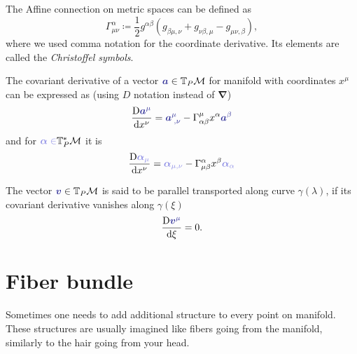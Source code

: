 \begin{definition}
The Affine connection on metric spaces can be defined as
    \begin{equation}
        \Gamma^{\alpha}_{\mu\nu} \coloneqq \frac{1}{2}g^{\alpha \beta}\left(g_{\beta\mu,\nu}+g_{\nu\beta,\mu}-g_{\mu\nu,\beta}\right),
    \end{equation}
    where we used comma notation for the coordinate derivative. Its elements are called the \emph{Christoffel symbols}.
\end{definition}
    The covariant derivative of a vector $\bluee{\bm a}\in \T_P\M$ for manifold with coordinates $x^\mu$ can be expressed as (using $D$ notation instead of $\bm \nabla$)
    \begin{equation}
        \Der{\bluee{\bm a^\mu}}{x^\nu}=\bluee{\bm a_{\;,\nu}^\mu}-\Gamma^\mu_{\alpha\beta} x^\alpha \bluee{\bm a^\beta}
    \end{equation}
    and for $\blueee{\bm\alpha\in} \T_P^*\M$ it is
\begin{equation}
    \Der{\blueee{\bm \alpha_\mu}}{x^\nu}=\blueee{\bm \alpha_{\mu,\nu}}-\Gamma^\alpha_{\mu\beta}x^\beta \blueee{\bm \alpha_\alpha}
\end{equation}

The vector $\bluee{\bm v}\in \T_P\M$ is said to be parallel transported along curve $\gamma(\lambda)$, if its covariant derivative vanishes along $\gamma(\xi)$
\begin{equation}
    \Der{\bluee{\bm v^\mu}}{\xi}=0.
\end{equation}

\section{Fiber bundle}
\label{sec:bundleDef}
Sometimes one needs to add additional structure to every point on manifold. These structures are usually imagined like fibers going from the manifold, similarly to the hair going from your head.

